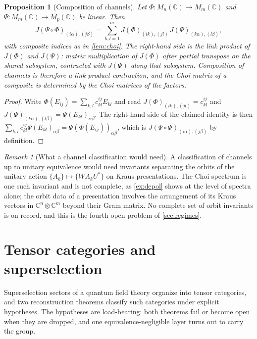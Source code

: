 \documentclass[11pt,letterpaper]{article}
\newtheorem{proposition}[theorem]{Proposition}
\theoremstyle{definition}
\theoremstyle{remark}
\newtheorem{remark}[theorem]{Remark}
\begin{document}
\begin{proposition}[Composition of channels]
\label{prop:compose}
Let $\Phi: M_n(\mathbb{C}) \to M_m(\mathbb{C})$ and $\Psi: M_m(\mathbb{C}) \to M_p(\mathbb{C})$ be linear. Then
\[
J(\Psi \circ \Phi)_{(i\alpha),(j\beta)} = \sum_{k,l=1}^{m} J(\Phi)_{(ik),(jl)} \, J(\Psi)_{(k\alpha),(l\beta)},
\]
with composite indices as in \cref{lem:choi}. The right-hand side is the link product of $J(\Phi)$ and $J(\Psi)$: matrix multiplication of $J(\Phi)$ after partial transpose on the shared subsystem, contracted with $J(\Psi)$ along that subsystem. Composition of channels is therefore a link-product contraction, and the Choi matrix of a composite is determined by the Choi matrices of the factors.
\end{proposition}

\begin{proof}
Write $\Phi(E_{ij}) = \sum_{k,l} c^{ij}_{kl} E_{kl}$ and read $J(\Phi)_{(ik),(jl)} = c^{ij}_{kl}$ and $J(\Psi)_{(k\alpha),(l\beta)} = \Psi(E_{kl})_{\alpha\beta}$. The right-hand side of the claimed identity is then $\sum_{k,l} c^{ij}_{kl} \Psi(E_{kl})_{\alpha\beta} = \Psi(\Phi(E_{ij}))_{\alpha\beta}$, which is $J(\Psi \circ \Phi)_{(i\alpha),(j\beta)}$ by definition.
\end{proof}

\begin{remark}[What a channel classification would need]
\label{rem:channelclass}
A classification of channels up to unitary equivalence would need invariants separating the orbits of the unitary action $\{A_k\} \mapsto \{W A_k U^*\}$ on Kraus presentations. The Choi spectrum is one such invariant and is not complete, as \cref{ex:depol} shows at the level of spectra alone; the orbit data of a presentation involves the arrangement of its Kraus vectors in $\mathbb{C}^n \otimes \mathbb{C}^m$ beyond their Gram matrix. No complete set of orbit invariants is on record, and this is the fourth open problem of \cref{sec:regimes}.
\end{remark}

\section{Tensor categories and superselection}
\label{sec:tensor}

Superselection sectors of a quantum field theory organize into tensor categories, and two reconstruction theorems classify such categories under explicit hypotheses. The hypotheses are load-bearing: both theorems fail or become open when they are dropped, and one equivalence-negligible layer turns out to carry the group.
\end{document}
